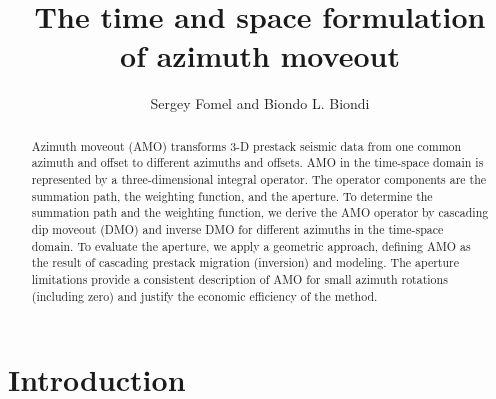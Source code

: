 
  

\title{The time and space formulation \\ of azimuth moveout}

\author{Sergey Fomel and Biondo L. Biondi}
\maketitle

\begin{abstract}
Azimuth moveout (AMO) transforms 3-D prestack seismic data from one
common azimuth and offset to different azimuths and offsets.
AMO in the time-space domain is represented by a three-dimensional
integral operator. The operator components are the summation path,
the weighting function, and the aperture. To determine the summation path and
the weighting function, we derive the AMO operator by cascading dip
moveout (DMO) and inverse DMO for different azimuths in the time-space
domain. To evaluate the aperture, we apply a geometric approach,
defining AMO as the result of cascading prestack migration (inversion)
and modeling. The aperture limitations provide a consistent
description of AMO for small azimuth rotations (including zero) and justify the
economic efficiency of the method. 
\end{abstract}

\section{Introduction}


